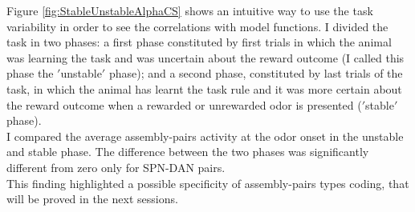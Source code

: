 Figure \ref{fig:StableUnstableAlphaCS} shows an intuitive way to use the task variability in order to see the correlations with model functions. I divided the task in two phases: a first phase constituted by first trials in which the animal was learning the task and was uncertain about the reward outcome (I called this phase the $'$unstable$'$ phase); and a second phase, constituted by last trials of the task, in which the animal has learnt the task rule and it was more certain about the reward outcome when a rewarded or unrewarded odor is presented ($'$stable$'$ phase).\\I compared the average assembly-pairs activity at the odor onset in the unstable and stable phase. The difference between the two phases was significantly different from zero only for SPN-DAN pairs.\\This finding highlighted a possible specificity of assembly-pairs types coding, that will be proved in the next sessions.
